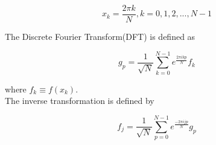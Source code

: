 \documentclass[a4,12pt,oneside]{report}
\begin{document}
        \begin{equation}
         x_k = \frac{2\pi k}{N}, k=0,1,2,...,N-1
        \end{equation}
        
        The Discrete Fourier Transform(DFT) is defined as
        
        \begin{equation}
         g_p = \frac{1}{\sqrt{N}}\sum_{k=0}^{N-1} e^{\frac{2\pi i kp}{N}} f_k
        \end{equation}
        
        where $f_k \equiv f(x_k)$.
        \\
        The inverse transformation is defined by
        
        \begin{equation}
         f_j = \frac{1}{\sqrt{N}}\sum_{p=0}^{N-1} e^{\frac{-2\pi i jp}{N}} g_p
        \end{equation}

       
	
\end{document}
